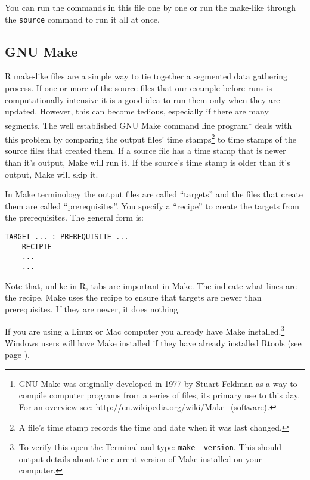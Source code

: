 You can run the commands in this file one by one or run the make-like through the \texttt{source} command to run it all at once.

\subsection{GNU Make}

R make-like files are a simple way to tie together a segmented data gathering process. If one or more of the source files that our example before runs is computationally intensive it is a good idea to run them only when they are updated. However, this can become tedious, especially if there are many segments. The well established GNU Make command line program\footnote{GNU Make was originally developed in 1977 by Stuart Feldman as a way to compile computer programs from a series of files, its primary use to this day. For an overview see: \url{http://en.wikipedia.org/wiki/Make_(software)}.} deals with this problem by comparing the output files' time stamps\footnote{A file's time stamp records the time and date when it was last changed.} to time stamps of the source files that created them. If a source file has a time stamp that is newer than it's output, Make will run it. If the source's time stamp is older than it's output, Make will skip it.

In Make terminology the output files are called ``targets'' and the files that create them are called ``prerequisites''. You specify a ``recipe'' to create the targets from the prerequisites. The general form is:

\begin{knitrout}
    \color{fgcolor}
    \begin{kframe}
        \begin{verbatim}
TARGET ... : PREREQUISITE ...
    RECIPIE
    ... 
    ...
            \end{verbatim}
        \end{kframe}
\end{knitrout}

Note that, unlike in R, tabs are important in Make. The indicate what lines are the recipe. Make uses the recipe to ensure that targets are newer than prerequisites. If they are newer, it does nothing.

If you are using a Linux or Mac computer you already have Make installed.\footnote{To verify this open the Terminal and type: \texttt{make --version}. This should output details about the current version of Make installed on your computer.} Windows users will have Make installed if they have already installed Rtools (see page \pageref{RtoolsDownload}).

